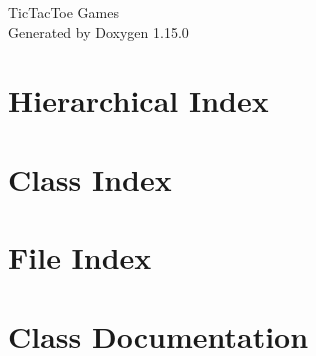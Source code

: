 \documentclass[twoside]{book}
\newcommand{\+}{\discretionary{\mbox{\scriptsize$\hookleftarrow$}}{}{}}
\newcommand{\clearemptydoublepage}{%
    \newpage{\pagestyle{empty}\cleardoublepage}%
  }
\begin{document}
  \raggedbottom
    \hypersetup{pageanchor=false,
                bookmarksnumbered=true,
                pdfencoding=unicode
               }
  \begin{titlepage}
  \vspace*{7cm}
  \begin{center}%
  {\Large Tic\+Tac\+Toe Games}\\
  \vspace*{1cm}
  {\large Generated by Doxygen 1.15.0}\\
  \end{center}
  \end{titlepage}
  \clearemptydoublepage
  \tableofcontents
  \clearemptydoublepage
  \hypersetup{pageanchor=true}
\chapter{Hierarchical Index}

\chapter{Class Index}

\chapter{File Index}

\chapter{Class Documentation}

































\end{document}
